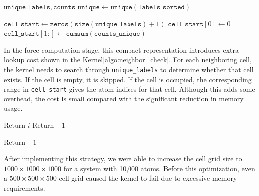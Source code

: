 \documentclass[12pt]{article}
\begin{document}
\begin{algorithm}
\caption{Build Compact Cell Index Structure}\label{algo:compact_cell_list}
\begin{algorithmic}[1]
\State $\texttt{unique\_labels}, \texttt{counts\_unique} \gets \texttt{unique}(\texttt{labels\_sorted})$

\State $\texttt{cell\_start} \gets \texttt{zeros}(\texttt{size}(\texttt{unique\_labels}) + 1)$ 
\State $\texttt{cell\_start}[0] \gets 0$
\State $\texttt{cell\_start}[1:] \gets \texttt{cumsum}(\texttt{counts\_unique})$
\end{algorithmic}
\end{algorithm}

In the force computation stage, this compact representation introduces extra lookup cost shown in the Kernel\ref{algo:neighbor_check}. For each neighboring cell, the kernel needs to search through \texttt{unique\_labels} to determine whether that cell exists. If the cell is empty, it is skipped. If the cell is occupied, the corresponding range in \texttt{cell\_start} gives the atom indices for that cell. Although this adds some overhead, the cost is small compared with the significant reduction in memory usage.

\begin{algorithm}
\caption{Check Whether Neighbor Cell Exists}\label{algo:neighbor_check}
\begin{algorithmic}[1]
        \State Return $i$
        \State Return $-1$
    \EndIf
\EndFor

\State Return $-1$

\end{algorithmic}
\end{algorithm}

After implementing this strategy, we were able to increase the cell grid size to $1000 \times 1000 \times 1000$ for a system with 10,000 atoms. Before this optimization, even a $500 \times 500 \times 500$ cell grid caused the kernel to fail due to excessive memory requirements.
\end{document}

